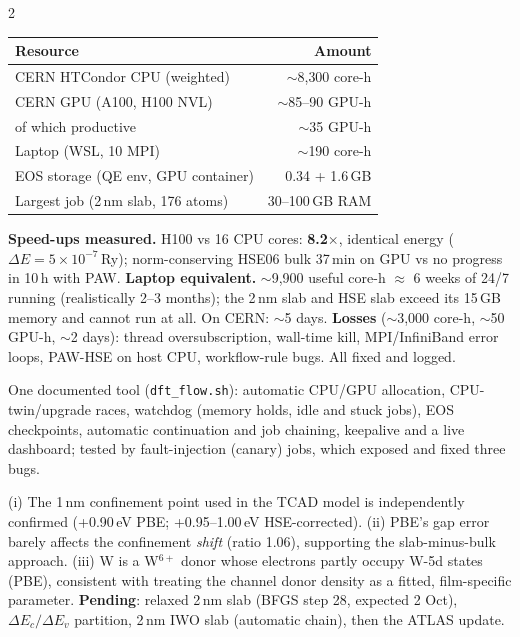 \documentclass[9pt]{extarticle}
\newcommand{\sect}[1]{\par\vspace{3pt}{\bfseries #1}\par\vspace{1pt}}
\begin{document}
\sect{3. Computing resources}
\begin{multicols}{2}
\begin{tabularx}{\columnwidth}{@{}>{\raggedright\arraybackslash}X r@{}}
\toprule
Resource & Amount \\
\midrule
CERN HTCondor CPU (weighted) & $\sim$8{,}300 core-h \\
CERN GPU (A100, H100 NVL) & $\sim$85--90 GPU-h \\
\quad of which productive & $\sim$35 GPU-h \\
Laptop (WSL, 10 MPI) & $\sim$190 core-h \\
EOS storage (QE env, GPU container) & 0.34 + 1.6\,GB \\
Largest job (2\,nm slab, 176 atoms) & 30--100\,GB RAM \\
\bottomrule
\end{tabularx}
\columnbreak

\textbf{Speed-ups measured.} H100 vs 16 CPU cores: \textbf{8.2$\times$}, identical energy ($\Delta E = 5\times10^{-7}$\,Ry);
norm-conserving HSE06 bulk 37\,min on GPU vs no progress in 10\,h with PAW.
\textbf{Laptop equivalent.} $\sim$9{,}900 useful core-h $\approx$ 6 weeks of 24/7 running (realistically 2--3 months);
the 2\,nm slab and HSE slab exceed its 15\,GB memory and cannot run at all. On CERN: $\sim$5 days.
\textbf{Losses} ($\sim$3{,}000 core-h, $\sim$50 GPU-h, $\sim$2 days): thread oversubscription, wall-time kill,
MPI/InfiniBand error loops, PAW-HSE on host CPU, workflow-rule bugs. All fixed and logged.
\end{multicols}

\sect{4. Workflow}
One documented tool (\texttt{dft\_flow.sh}): automatic CPU/GPU allocation, CPU-twin/upgrade races, watchdog
(memory holds, idle and stuck jobs), EOS checkpoints, automatic continuation and job chaining, keepalive and a live
dashboard; tested by fault-injection (canary) jobs, which exposed and fixed three bugs.

\sect{5. Implications and next steps}
(i) The 1\,nm confinement point used in the TCAD model is independently confirmed (+0.90\,eV PBE; +0.95--1.00\,eV
HSE-corrected). (ii) PBE's gap error barely affects the confinement \emph{shift} (ratio 1.06), supporting the
slab-minus-bulk approach. (iii) W is a W$^{6+}$ donor whose electrons partly occupy W-5d states (PBE), consistent with
treating the channel donor density as a fitted, film-specific parameter. \textbf{Pending}: relaxed 2\,nm slab (BFGS step 28,
expected 2 Oct), $\Delta E_c/\Delta E_v$ partition, 2\,nm IWO slab (automatic chain), then the ATLAS update.
\end{document}
